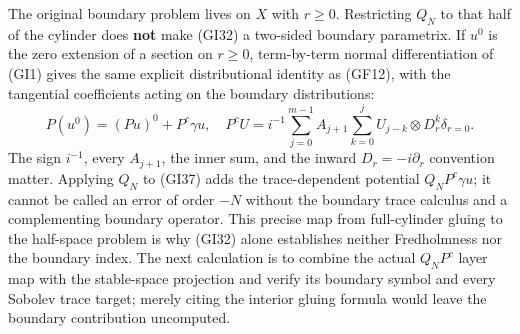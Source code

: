 \documentclass[
  11pt,
]{article}
\begin{document}
The original boundary problem lives on \(X\) with \(r\geq0\).
Restricting \(Q_N\) to that half of the cylinder does \textbf{not} make
(GI32) a two-sided boundary parametrix. If \(u^0\) is the zero extension
of a section on \(r\geq0\), term-by-term normal differentiation of (GI1)
gives the same explicit distributional identity as (GF12), with the
tangential coefficients acting on the boundary distributions: \[
 P(u^0)=(Pu)^0+P^c\gamma u,
 \quad
 P^cU=i^{-1}\sum_{j=0}^{m-1}A_{j+1}
                    \sum_{k=0}^{j}U_{j-k}\otimes D_r^k\delta_{r=0}.
 \tag{GI37}
\] The sign \(i^{-1}\), every \(A_{j+1}\), the inner sum, and the inward
\(D_r=-i\partial_r\) convention matter. Applying \(Q_N\) to (GI37) adds
the trace-dependent potential \(Q_NP^c\gamma u\); it cannot be called an
error of order \(-N\) without the boundary trace calculus and a
complementing boundary operator. This precise map from full-cylinder
gluing to the half-space problem is why (GI32) alone establishes neither
Fredholmness nor the boundary index. The next calculation is to combine
the actual \(Q_NP^c\) layer map with the stable-space projection and
verify its boundary symbol and every Sobolev trace target; merely citing
the interior gluing formula would leave the boundary contribution
uncomputed.
\end{document}
